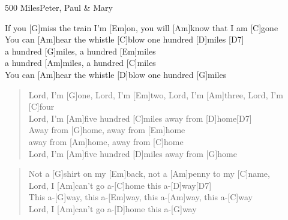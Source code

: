 \begin{song}{500 Miles}{Peter, Paul \& Mary}

    \begin{chorus}
        If you [G]miss the train I'm [Em]on, you will [Am]know that I am [C]gone \\
        You can [Am]hear the whistle [C]blow one hundred [D]miles \hspace{1em}[D7] \\
        a hundred [G]miles, a hundred [Em]miles \\
        a hundred [Am]miles, a hundred [C]miles \\
        You can [Am]hear the whistle [D]blow one hundred [G]miles
    \end{chorus}

    \begin{verse}  
        Lord, I'm [G]one, Lord, I'm [Em]two, Lord, I'm [Am]three, Lord, I'm [C]four \\
        Lord, I'm [Am]five hundred [C]miles away from [D]home\hspace{1em}[D7]\\
        Away from [G]home, away from [Em]home \\
        away from [Am]home, away from [C]home \\
        Lord, I'm [Am]five hundred [D]miles away from [G]home
    \end{verse}  

    \begin{verse}  
        Not a [G]shirt on my [Em]back, not a [Am]penny to my [C]name, \\
        Lord, I [Am]can't go a-[C]home this a-[D]way\hspace{1em}[D7] \\
        This a-[G]way, this a-[Em]way, this a-[Am]way, this a-[C]way \\
        Lord, I [Am]can't go a-[D]home this a-[G]way
    \end{verse}  


\end{song}
